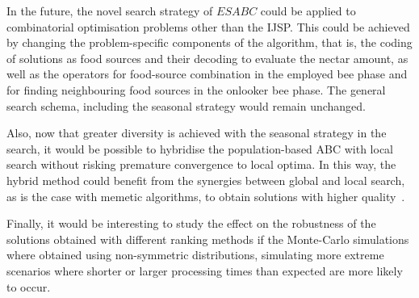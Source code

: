 \documentclass[icae]{iosart2x}
\newcommand{\reviewed}[1]{#1} %
\begin{document}
\reviewed{In the future, the novel search strategy of $ESABC$ could be applied to combinatorial optimisation problems other than the IJSP. This could be achieved by changing the problem-specific components of the algorithm, that is, the coding of solutions as food sources and their decoding to evaluate the nectar amount, as well as the operators for food-source combination in the employed bee phase and for finding neighbouring food sources in the onlooker bee phase. The general search schema, including the seasonal strategy would remain unchanged.}

\reviewed{Also, now that greater diversity is achieved with the seasonal strategy in the search, it would be possible to hybridise the population-based ABC with local search without risking premature convergence to local optima. In this way, the hybrid method could benefit from the synergies between global and local search, as is the case with memetic algorithms, to obtain solutions with higher quality~\cite{Gendreau2019}.}

\reviewed{Finally, it would be interesting to study the effect on the robustness of the solutions obtained with different ranking methods if the Monte-Carlo simulations where obtained using non-symmetric distributions, simulating more extreme scenarios where shorter or larger processing times than expected are more likely to occur.}
\end{document}
